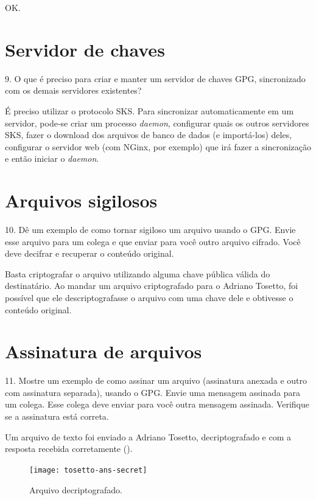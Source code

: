 \documentclass{article}
\begin{document}
    OK\@.

    \section{Servidor de chaves}

    \begin{superframe}
        9. O que é preciso para criar e manter um servidor de chaves GPG,
        sincronizado com os demais servidores existentes?
    \end{superframe}

    É preciso utilizar o protocolo SKS\@. Para sincronizar automaticamente em
    um servidor, pode-se criar um processo \textit{daemon}, configurar quais os
    outros servidores SKS, fazer o download dos arquivos de banco de dados (e
    importá-los) deles, configurar o servidor web (com NGinx, por exemplo) que
    irá fazer a sincronização e então iniciar o \textit{daemon}.

    \section{Arquivos sigilosos}

    \begin{superframe}
        10. Dê um exemplo de como tornar sigiloso um arquivo usando o GPG\@.
        Envie esse arquivo para um colega e que enviar para você outro arquivo
        cifrado. Você deve decifrar e recuperar o conteúdo original.
    \end{superframe}

    Basta criptografar o arquivo utilizando alguma chave pública válida do
    destinatário. Ao mandar um arquivo criptografado para o Adriano Tosetto,
    foi possível que ele descriptografasse o arquivo com uma chave dele e
    obtivesse o conteúdo original.

    \section{Assinatura de arquivos}

    \begin{superframe}
        11. Mostre um exemplo de como assinar um arquivo (assinatura anexada e
        outro com assinatura separada), usando o GPG\@. Envie uma mensagem
        assinada para um colega. Esse colega deve enviar para você outra
        mensagem assinada. Verifique se a assinatura está correta.
    \end{superframe}

    Um arquivo de texto foi enviado a Adriano Tosetto, decriptografado e com a
    resposta recebida corretamente ().

    \begin{figure}[h]
        \centering
        \texttt{[image: tosetto-ans-secret]}
        \caption{%
            Arquivo decriptografado.\label{fig:tosetto-decrypt}
        }
    \end{figure}
\end{document}

